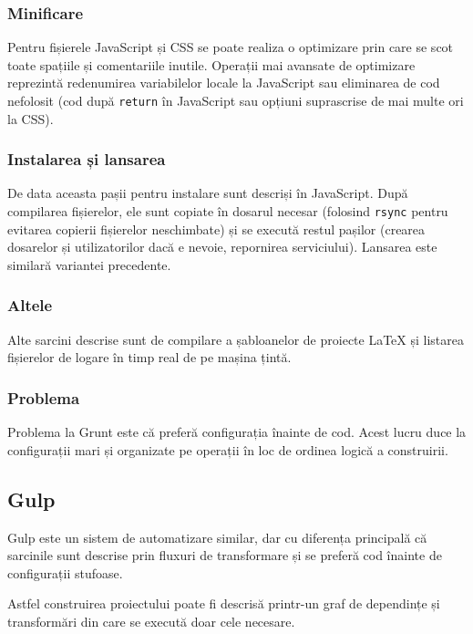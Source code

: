 \documentclass[a4wide,12pt]{report}
\newcommand{\cod}[1]{\texttt{#1}}
\begin{document}
\subsubsection{Minificare}

Pentru fișierele JavaScript și CSS se poate realiza o optimizare prin care se
scot toate spațiile și comentariile inutile. Operații mai avansate de optimizare
reprezintă redenumirea variabilelor locale la JavaScript sau eliminarea de cod
nefolosit (cod după \cod{return} în JavaScript sau opțiuni suprascrise de mai
multe ori la CSS).

\subsubsection{Instalarea și lansarea}

De data aceasta pașii pentru instalare sunt descriși în JavaScript. După
compilarea fișierelor, ele sunt copiate în dosarul necesar (folosind \cod{rsync}
pentru evitarea copierii fișierelor neschimbate) și se execută restul pașilor
(crearea dosarelor și utilizatorilor dacă e nevoie, repornirea serviciului).
Lansarea este similară variantei precedente.

\subsubsection{Altele}

Alte sarcini descrise sunt de compilare a șabloanelor de proiecte \LaTeX{} și
listarea fișierelor de logare în timp real de pe mașina țintă.

\subsubsection{Problema}

Problema la Grunt este că preferă configurația înainte de cod. Acest lucru duce
la configurații mari și organizate pe operații în loc de ordinea logică a
construirii.

\subsection{Gulp}

Gulp este un sistem de automatizare similar, dar cu diferența principală că
sarcinile sunt descrise prin fluxuri de transformare și se preferă cod înainte
de configurații stufoase.

Astfel construirea proiectului poate fi descrisă printr-un graf de dependințe și
transformări din care se execută doar cele necesare.
\end{document}
